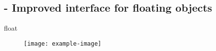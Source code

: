 
\subsection{ - Improved interface for floating objects}

\begin{demo}{}{float}
  \begin{figure}[H]
    \centering
    \texttt{[image: example-image]}
    \caption{}
  \end{figure}
\end{demo}
